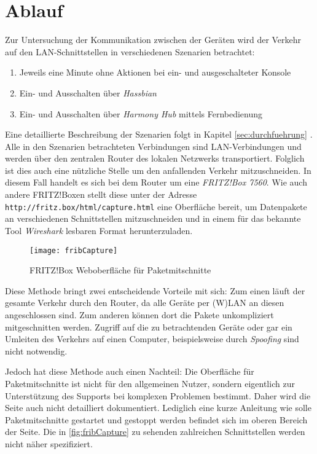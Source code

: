 \newpage
\section{Ablauf}\label{sec:ablauf}
Zur Untersuchung der Kommunikation zwischen der Geräten wird der Verkehr auf den LAN-Schnittstellen in verschiedenen Szenarien betrachtet:

\begin{enumerate}
    \setlength\itemsep{-0.5em}
    \item Jeweils eine Minute ohne Aktionen bei ein- und ausgeschalteter Konsole
    \item Ein- und Ausschalten über \textit{Hassbian}
    \item Ein- und Ausschalten über \textit{Harmony Hub} mittels Fernbedienung
\end{enumerate}

Eine detaillierte Beschreibung der Szenarien folgt in Kapitel \ref{sec:durchfuehrung} \textit{}.
Alle in den Szenarien betrachteten Verbindungen sind LAN-Verbindungen und werden über den zentralen Router des lokalen Netzwerks transportiert.
Folglich ist dies auch eine nützliche Stelle um den anfallenden Verkehr mitzuschneiden.
In diesem Fall handelt es sich bei dem Router um eine \textit{FRITZ!Box 7560}\cite{FRITZBox29:online}.
Wie auch andere FRITZ!Boxen stellt diese unter der Adresse \nolinkurl{http://fritz.box/html/capture.html} eine Oberfläche bereit,
um Datenpakete an verschiedenen Schnittstellen mitzuschneiden
und in einem für das bekannte Tool \textit{Wireshark} lesbaren Format herunterzuladen.

\begin{figure}[ht!]
    \centering
    \texttt{[image: fribCapture]}
    \caption{FRITZ!Box Weboberfläche für Paketmitschnitte}\label{fig:fribCapture}
\end{figure}

Diese Methode bringt zwei entscheidende Vorteile mit sich:
Zum einen läuft der gesamte Verkehr durch den Router, da alle Geräte per (W)LAN an diesen angeschlossen sind.
Zum anderen können dort die Pakete unkompliziert mitgeschnitten werden. Zugriff auf die zu betrachtenden Geräte
oder gar ein Umleiten des Verkehrs auf einen Computer, beispielsweise durch \textit{Spoofing}\cite{Maninthe12:online} sind nicht notwendig.

Jedoch hat diese Methode auch einen Nachteil:
Die Oberfläche für Paketmitschnitte ist nicht für den allgemeinen Nutzer,
sondern eigentlich zur Unterstützung des Supports bei komplexen Problemen bestimmt.
Daher wird die Seite auch nicht detailliert dokumentiert.
Lediglich eine kurze Anleitung wie solle Paketmitschnitte gestartet und gestoppt werden befindet sich im oberen Bereich der Seite.
Die in \autoref{fig:fribCapture} zu sehenden zahlreichen Schnittstellen werden nicht näher spezifiziert.

